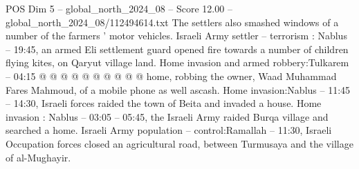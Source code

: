 \begin{textsample}{POS Dim 5 – global\_north\_2024\_08 – Score 12.00 – global\_north\_2024\_08/112494614.txt}
The settlers also smashed windows of a number of the farmers ' motor vehicles.
Israeli Army settler -- terrorism : Nablus -- 19:45, an armed Eli settlement guard opened fire towards a number of children flying kites, on Qaryut village land.
Home invasion and armed robbery:Tulkarem -- 04:15 @ @ @ @ @ @ @ @ @ @ home, robbing the owner, Waad Muhammad Fares Mahmoud, of a mobile phone as well ascash.
Home invasion:Nablus -- 11:45 -- 14:30, Israeli forces raided the town of Beita and invaded a house.
Home invasion : Nablus -- 03:05 -- 05:45, the Israeli Army raided Burqa village and searched a home.
Israeli Army population -- control:Ramallah -- 11:30, Israeli Occupation forces closed an agricultural road, between Turmusaya and the village of al-Mughayir.

\end{textsample}
